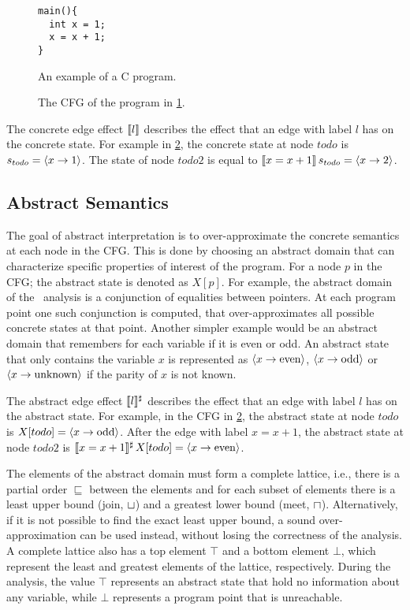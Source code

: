 \begin{figure}
\begin{verbatim}
main(){
  int x = 1;
  x = x + 1;
}
\end{verbatim}
\caption{An example of a C program.}
\label{fig:example-C-program}
\end{figure}
\begin{figure}
  \caption{The CFG of the program in \cref{fig:example-C-program}.}
  \label{ex:cfg}
\end{figure}

The concrete edge effect $\llbracket l\rrbracket$ describes the effect that an edge with label $l$ has on the concrete state.
For example in \cref{ex:cfg}, the concrete state at node $todo$ is $s_{todo} = \langle x \rightarrow 1\rangle$.
The state of node $todo2$ is equal to $\llbracket x = x+1\rrbracket\,s_{todo} = \langle x \rightarrow 2\rangle$.

\subsection{Abstract Semantics}

The goal of abstract interpretation is to over-approximate the concrete semantics at each node in the CFG.
This is done by choosing an abstract domain that can characterize specific properties of interest of the program.
For a node $p$ in the CFG; the abstract state is denoted as $X[p]$.
For example, the abstract domain of the \cpo\ analysis is a conjunction of equalities between pointers.
At each program point one such conjunction is computed, that over-approximates all possible concrete states at that point.
Another simpler example would be an abstract domain that remembers for each variable if it is even or odd.
An abstract state that only contains the variable $x$ is represented as $\langle x \rightarrow \text{even}\rangle$, $\langle x \rightarrow \text{odd}\rangle$ or $\langle x \rightarrow \text{unknown}\rangle$ if the parity of $x$ is not known.

The abstract edge effect $\llbracket l\rrbracket^\sharp$ describes the effect that an edge with label $l$ has on the abstract state.
For example, in the CFG in \cref{ex:cfg}, the abstract state at node $todo$ is $X[todo] = \langle x \rightarrow \text{odd}\rangle$.
After the edge with label $x = x+1$, the abstract state at node $todo2$ is $\llbracket x = x+1\rrbracket^\sharp\,X[todo] = \langle x \rightarrow \text{even}\rangle$.

The elements of the abstract domain must form a complete lattice, i.e., there is a partial order $\sqsubseteq$ between the elements and for each subset of elements there is a least upper bound (join, $\sqcup$) and a greatest lower bound (meet, $\sqcap$).
Alternatively, if it is not possible to find the exact least upper bound, a sound over-approximation
can be used instead, without losing the correctness of the analysis.
A complete lattice also has a top element $\top$ and a bottom element $\bot$, which represent the least and greatest elements of the lattice, respectively.
During the analysis, the value $\top$ represents an abstract state that hold no information
about any variable, while $\bot$ represents a program point that is unreachable.

